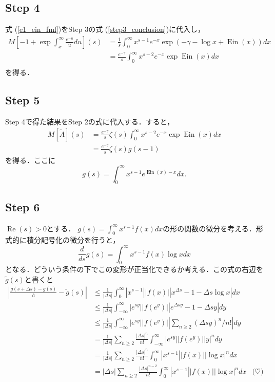 \documentclass{jsarticle}
\newcommand{\Ein}{\operatorname{Ein}}
\renewcommand\Re{\operatorname{Re}}
\theoremstyle{definition}
\begin{document}
\subsection*{Step 4}

式 (\ref{e1_ein_fml})をStep 3の式 (\ref{step3_conclusion})に代入し，
\begin{align*}
M\left[ -1 + \exp \int_{x}^\infty \frac{e^{-u}}{u} du \right](s) &= \frac{1}{s} \int_0^\infty x^{s-1} e^{-x}  \exp \left(-\gamma-\log x+\Ein(x)\right)  dx \\
&= \frac{e^{-\gamma}}{s} \int_0^\infty x^{s-2} e^{-x}  \exp \Ein(x) dx \\
\end{align*}
を得る．

\subsection*{Step 5}
Step 4で得た結果をStep 2の式に代入する．すると，
\begin{align*}
M[\tilde{A}](s) &= \frac{e^{-\gamma}}{s} \zeta(s) \int_0^\infty x^{s-2} e^{-x}  \exp \Ein(x) dx \\
&= \frac{e^{-\gamma}}{s} \zeta(s) g(s-1)
\end{align*}
を得る．ここに
\[ g(s) = \int_0^\infty x^{s-1} e^{\Ein(x)-x} dx. \]

\subsection*{Step 6}
$\Re(s) > 0$とする．
$g(s) = \int_0^\infty x^{s-1} f(x) dx$の形の関数の微分を考える．形式的に積分記号化の微分を行うと，
\begin{equation}
\frac{d}{ds} g(s) = \int_0^\infty x^{s-1} f(x) \log x dx \label{dgds}
\end{equation}
となる．どういう条件の下でこの変形が正当化できるか考える．この式の右辺を$\tilde{g}(s)$と書くと
\begin{align*}
\left|\frac{g(s+\Delta s) - g(s)}{h} - \tilde{g}(s)\right| &\le \frac{1}{|\Delta s|} \int_0^\infty |x^{s-1}| |f(x)| |x^{\Delta s}-1-\Delta s \log x| dx \\
 &\le \frac{1}{|\Delta s|} \int_{-\infty}^\infty |e^{sy}| |f(e^y)| |e^{\Delta sy}-1-\Delta sy| dy \\
 &\le \frac{1}{|\Delta s|} \int_{-\infty}^\infty |e^{sy}| |f(e^y)| |\sum_{n\ge 2} (\Delta sy)^n / n!| dy \\
 &= \frac{1}{|\Delta s|} \sum_{n\ge 2} \frac{|\Delta s|^n}{n!} \int_{-\infty}^\infty |e^{sy}| |f(e^y)| |y|^n dy\\
 &= \frac{1}{|\Delta s|} \sum_{n\ge 2} \frac{|\Delta s|^n}{n!} \int_{0}^\infty |x^{s-1}| |f(x)| |\log x|^n dx \\
 &= |\Delta s| \sum_{n\ge 2} \frac{|\Delta s|^{n-2}}{n!} \int_{0}^\infty |x^{s-1}| |f(x)| |\log x|^n dx & \text{($\heartsuit$)} \\
\end{align*}
\end{document}
